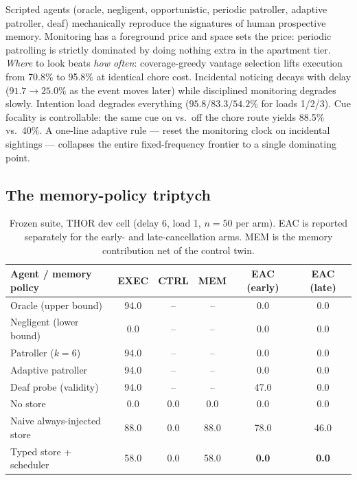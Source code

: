\documentclass[10pt]{article}
\begin{document}
Scripted agents (oracle, negligent, opportunistic, periodic patroller,
adaptive patroller, deaf) mechanically reproduce the signatures of human
prospective memory. Monitoring has a foreground price and space sets the price:
periodic patrolling is strictly dominated by doing nothing extra in the
apartment tier. \emph{Where} to look beats \emph{how often}: coverage-greedy
vantage selection lifts execution from 70.8\% to 95.8\% at identical chore
cost. Incidental noticing decays with delay ($91.7 \to 25.0\%$ as the event
moves later) while disciplined monitoring degrades slowly. Intention load
degrades everything ($95.8 / 83.3 / 54.2\%$ for loads 1/2/3). Cue focality is
controllable: the same cue on vs.\ off the chore route yields 88.5\% vs.\ 40\%.
A one-line adaptive rule --- reset the monitoring clock on incidental sightings
--- collapses the entire fixed-frequency frontier to a single dominating point.

\subsection{The memory-policy triptych}

\begin{table}[t]
\centering\small
\caption{Frozen suite, THOR dev cell (delay 6, load 1, $n{=}50$ per arm).
EAC is reported separately for the early- and late-cancellation arms.
MEM is the memory contribution net of the control twin.}
\label{tab:headline}
\begin{tabular}{lccccc}
\toprule
Agent / memory policy & EXEC & CTRL & MEM & EAC (early) & EAC (late) \\
\midrule
Oracle (upper bound)        & 94.0 & --   & --   & 0.0  & 0.0 \\
Negligent (lower bound)     & 0.0  & --   & --   & 0.0  & 0.0 \\
Patroller ($k{=}6$)         & 94.0 & --   & --   & 0.0  & 0.0 \\
Adaptive patroller          & 94.0 & --   & --   & 0.0  & 0.0 \\
Deaf probe (validity)       & 94.0 & --   & --   & 47.0 & 0.0 \\
\midrule
No store                    & 0.0  & 0.0  & 0.0  & 0.0  & 0.0 \\
Naive always-injected store & 88.0 & 0.0  & 88.0 & 78.0 & 46.0 \\
Typed store + scheduler     & 58.0 & 0.0  & 58.0 & \bf 0.0 & \bf 0.0 \\
\bottomrule
\end{tabular}
\end{table}
\end{document}
